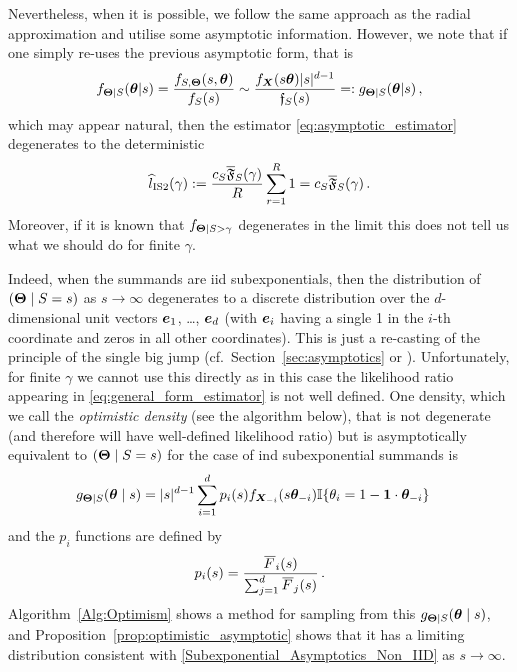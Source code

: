 Nevertheless, when it is possible, we follow the same approach as the radial approximation and utilise some asymptotic information. However, we note that if one simply re-uses the previous asymptotic form, that is
\[ f_{\bm{\Theta} \mid S}(\bm{\theta} | s) = \frac{f_{S,\bm{\Theta}}(s, \bm{\theta})}{f_S(s)} \sim \frac{f_{\bm{X}}(s \bm{\theta}) |s|^{d-1}}{\mathfrak{f}_S(s)} =: g_{\bm{\Theta} \mid S}(\bm{\theta} | s) \,, \]
which may appear natural, then the estimator \eqref{eq:asymptotic_estimator} degenerates to the deterministic
\begin{equation*} \label{eq:double_asymptotic_estimator}
\widehat{l}_{\mathrm{IS2}}(\gamma) := \frac{c_S \overline{\mathfrak{F}}_S(\gamma)}{R} \sum_{r=1}^R 1 = c_S \overline{\mathfrak{F}}_S(\gamma) \,.
\end{equation*}
Moreover, if it is known that $f_{\bm{\Theta} \mid S > \gamma}$ degenerates in the limit
this does not tell us what we should do for finite $\gamma$.

Indeed, when the summands are iid subexponentials, then the distribution of $(\bm{\Theta} \mid S = s)$ as $s\to\infty$ degenerates to a discrete distribution over the $d$-dimensional unit vectors $\bm{e}_1$, \dots, $\bm{e}_d$
(with $\bm{e}_i$ having a single 1 in the $i$-th coordinate and zeros in all other coordinates).
This is just a re-casting of the principle of the single big jump (cf.\ Section~\ref{sec:asymptotics} or \cite{foss2011introduction}).
Unfortunately, for finite $\gamma$ we cannot use this directly as in this case the likelihood ratio appearing in \eqref{eq:general_form_estimator} is not well defined.
One density, which we call the \emph{optimistic density} (see the algorithm below), that is not degenerate (and therefore will have well-defined likelihood ratio) but is
asymptotically equivalent to $(\bm{\Theta} \mid S = s)$ for the case of ind subexponential summands is
\begin{align} \label{OptimisticPDF}
g_{\bm{\Theta} \mid S}(\bm{\theta} \mid s)
&= |s|^{d-1} \sum_{i=1}^d p_i(s) f_{\bm{X}_{-i}}(s \bm{\theta}_{-i}) \mathbb{I}\{  \theta_i = 1-\bm{1} \cdot \bm{\theta}_{-i}  \}
\end{align}
and the $p_i$ functions are defined by
\begin{equation} \label{optim_pi}
p_i(s) = \frac{\Ftail _i(s)}{\sum_{j=1}^d \Ftail _j(s)} \,.
\end{equation}
Algorithm~\ref{Alg:Optimism} shows a method for sampling from this $g_{\bm{\Theta} \mid S}(\bm{\theta} \mid s)$, and Proposition~\ref{prop:optimistic_asymptotic} shows that it
has a limiting distribution consistent with \eqref{Subexponential_Asymptotics_Non_IID} as $s \to \infty$.

